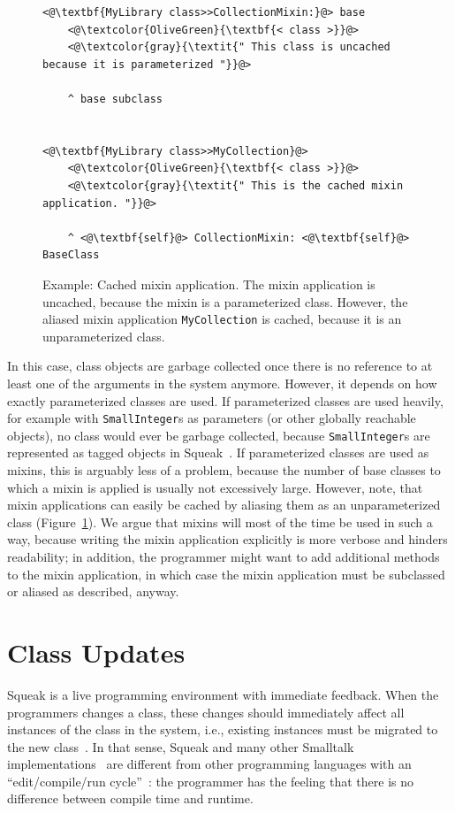 \begin{figure}[!htp]
\begin{minipage}{\textwidth}
\begin{lstlisting}
<@\textbf{MyLibrary class>>CollectionMixin:}@> base
    <@\textcolor{OliveGreen}{\textbf{< class >}}@>
    <@\textcolor{gray}{\textit{" This class is uncached because it is parameterized "}}@>

    ^ base subclass


<@\textbf{MyLibrary class>>MyCollection}@>
    <@\textcolor{OliveGreen}{\textbf{< class >}}@>
    <@\textcolor{gray}{\textit{" This is the cached mixin application. "}}@>

    ^ <@\textbf{self}@> CollectionMixin: <@\textbf{self}@> BaseClass
\end{lstlisting}
\caption[Cached mixin application]{Example: Cached mixin application. The mixin application is uncached, because the mixin is a parameterized class. However, the aliased mixin application \texttt{MyCollection} is cached, because it is an unparameterized class.}
\label{fig:impl_cached_mixin_application}
\end{minipage}
\end{figure}

In this case, class objects are garbage collected once there is no reference to at least one of the arguments in the system anymore. However, it depends on how exactly parameterized classes are used. If parameterized classes are used heavily, for example with \texttt{SmallInteger}s as parameters (or other globally reachable objects), no class would ever be garbage collected, because \texttt{SmallInteger}s are represented as tagged objects in Squeak~\cite{Bolz:2008:BFO:1482373.1482382, papetechreport}. If parameterized classes are used as mixins, this is arguably less of a problem, because the number of base classes to which a mixin is applied is usually not excessively large. However, note, that mixin applications can easily be cached by aliasing them as an unparameterized class (Figure~\ref{fig:impl_cached_mixin_application}). We argue that mixins will most of the time be used in such a way, because writing the mixin application explicitly is more verbose and hinders readability; in addition, the programmer might want to add additional methods to the mixin application, in which case the mixin application must be subclassed or aliased as described, anyway.

\section{Class Updates}
Squeak is a live programming environment with immediate feedback. When the programmers changes a class, these changes should immediately affect all instances of the class in the system, i.e., existing instances must be migrated to the new class~\cite{casaccio2011bootstrapping}. In that sense, Squeak and many other Smalltalk implementations~\cite{Penney:1987:CMG:38765.38817} are different from other programming languages with an ``edit/compile/run cycle''~\cite{conf/sofsem/NierstraszG10}: the programmer has the feeling that there is no difference between compile time and runtime.

